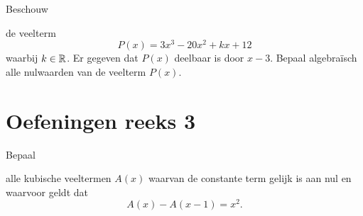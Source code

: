 \documentclass{ximera}
\begin{document}
\begin{Oefening}\setcounter{enumi}{8}
\hypertarget{oef4.8}{Beschouw} de veelterm
\[
P(x) = 3x^3-20x^2+kx+12
\]
waarbij $k \in \mathbb{R}$. Er gegeven dat $P(x)$ deelbaar is door $x-3$. Bepaal algebra\"isch alle nulwaarden van de veelterm $P(x)$.
\end{Oefening}

\section*{Oefeningen reeks 3}

\begin{Oefening}\setcounter{enumi}{9}
\hypertarget{oef4.9}{Bepaal} alle kubische veeltermen $A(x)$ waarvan de constante term gelijk is aan nul en waarvoor geldt dat
\[
A(x) - A(x-1) = x^2.
\]
\end{Oefening}
\end{document}
